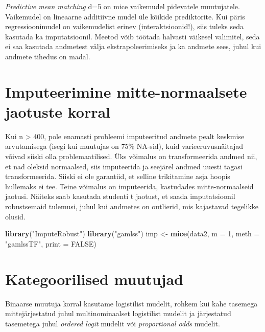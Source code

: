 \documentclass[]{book}
\newenvironment{Shaded}{\begin{snugshade}}{\end{snugshade}}
\newcommand{\KeywordTok}[1]{\textcolor[rgb]{0.13,0.29,0.53}{\textbf{#1}}}
\newcommand{\DataTypeTok}[1]{\textcolor[rgb]{0.13,0.29,0.53}{#1}}
\newcommand{\DecValTok}[1]{\textcolor[rgb]{0.00,0.00,0.81}{#1}}
\newcommand{\StringTok}[1]{\textcolor[rgb]{0.31,0.60,0.02}{#1}}
\newcommand{\OtherTok}[1]{\textcolor[rgb]{0.56,0.35,0.01}{#1}}
\newcommand{\NormalTok}[1]{#1}
\begin{document}
\emph{Predictive mean matching} d=5 on mice vaikemudel pidevatele
muutujatele. Vaikemudel on lineaarne additiivne mudel üle kõikide
prediktorite. Kui päris regressioonimudel on vaikemudelist erinev
(interaktsioonid!), siis tuleks seda kasutada ka imputatsioonil. Meetod
võib töötada halvasti väikesel valimitel, seda ei saa kasutada andmetest
välja ekstrapoleerimiseks ja ka andmete sees, juhul kui andmete tihedus
on madal.

\section{Imputeerimine mitte-normaalsete jaotuste
korral}\label{imputeerimine-mitte-normaalsete-jaotuste-korral}

Kui n \textgreater{} 400, pole enamasti probleemi imputeeritud andmete
pealt keskmise arvutamisega (isegi kui muutujas on 75\% NA-sid), kuid
varieeruvusnäitajad võivad siiski olla problemaatilised. Üks võimalus on
transformeerida andmed nii, et nad oleksid normaalsed, siis imputeerida
ja seejärel andmed uuesti tagasi transformeerida. Siiski ei ole
garantiid, et selline trikitamine asja hoopis hullemaks ei tee. Teine
võimalus on imputeerida, kastudades mitte-normaalseid jaotusi. Näiteks
saab kasutada studenti t jaotust, et saada imputatsioonil robustsemaid
tulemusi, juhul kui andmetes on outlierid, mis kajastavad tegelikke
olusid.

\begin{Shaded}
\begin{Highlighting}[]
\KeywordTok{library}\NormalTok{(}\StringTok{"ImputeRobust"}\NormalTok{)}
\KeywordTok{library}\NormalTok{(}\StringTok{"gamlss"}\NormalTok{)}
\NormalTok{imp <-}\StringTok{ }\KeywordTok{mice}\NormalTok{(data2, }\DataTypeTok{m =} \DecValTok{1}\NormalTok{, }\DataTypeTok{meth =} \StringTok{"gamlssTF"}\NormalTok{, }\DataTypeTok{print =} \OtherTok{FALSE}\NormalTok{)}
\end{Highlighting}
\end{Shaded}

\section{Kategoorilised muutujad}\label{kategoorilised-muutujad}

Binaarse muutuja korral kasutame logistilist mudelit, rohkem kui kahe
tasemega mittejärjestatud juhul multinominaalset logistilist mudelit ja
järjestatud tasemetega juhul \emph{ordered logit} mudelit või
\emph{proportional odds} mudelit.
\end{document}
